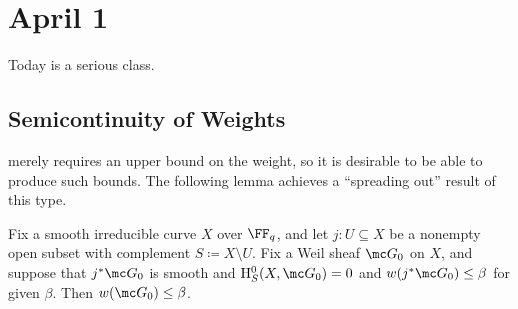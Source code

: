 \documentclass[../notes.tex]{subfiles}
\begin{document}
\section{April 1}
Today is a serious class.

\subsection{Semicontinuity of Weights}
 merely requires an upper bound on the weight, so it is desirable to be able to produce such bounds. The following lemma achieves a ``spreading out'' result of this type.
\begin{lemma} \label{lem:semicontinuity-curves}
	Fix a smooth irreducible curve $X$ over $\FF_q$, and let $j\colon U\subseteq X$ be a nonempty open subset with complement $S\coloneqq X\setminus U$. Fix a Weil sheaf $\mc G_0$ on $X$, and suppose that $j^*\mc G_0$ is smooth and $\mathrm H^0_S(X,\mc G_0)=0$ and $w(j^*\mc G_0)\le\beta$ for given $\beta$. Then $w(\mc G_0)\le\beta$.
\end{lemma}
\end{document}
